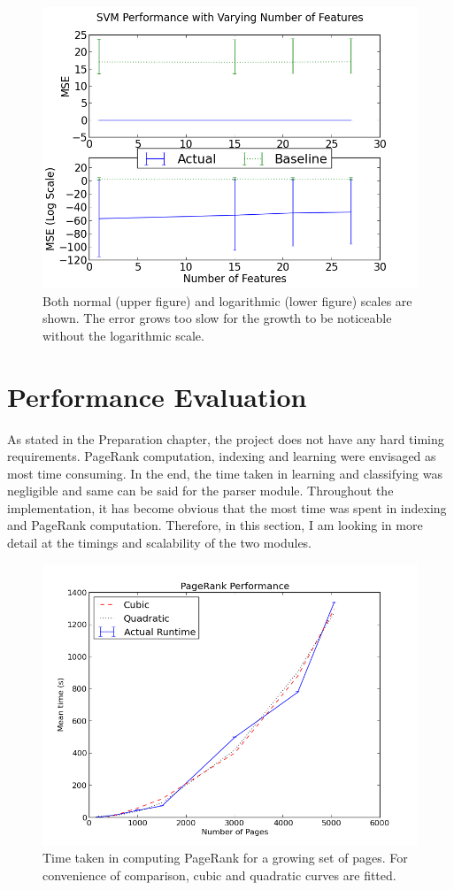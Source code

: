 \documentclass[12pt,notitlepage,twoside]{scrbook}
\begin{document}
\begin{figure}[h!]
\centering
  \includegraphics[width=0.8\linewidth]{figs/svm_feats.png}
  \caption{Both normal (upper figure) and logarithmic (lower figure)  scales are shown.
  The error grows too slow for the growth to be noticeable without the logarithmic scale.
  \label{svm_feats}}
\end{figure}



\section{Performance Evaluation}
As stated in the Preparation chapter, the project does not have any hard timing requirements.
PageRank computation, indexing and learning were envisaged as most time consuming. In the
end, the time taken in learning and classifying was negligible and same can be said for
the parser module.
Throughout the implementation, it has become obvious that the most time was spent in
indexing and PageRank computation. Therefore, in this section, I am looking in more detail
at the timings and scalability of the two modules.
\begin{figure}[h!]
  \centering
    \includegraphics[width=0.8\linewidth]{figs/pr.png}
    \caption{Time taken in computing PageRank for a growing set of pages. For convenience
	    of comparison, cubic and quadratic curves are fitted.\label{pr}}
\end{figure}
\end{document}
